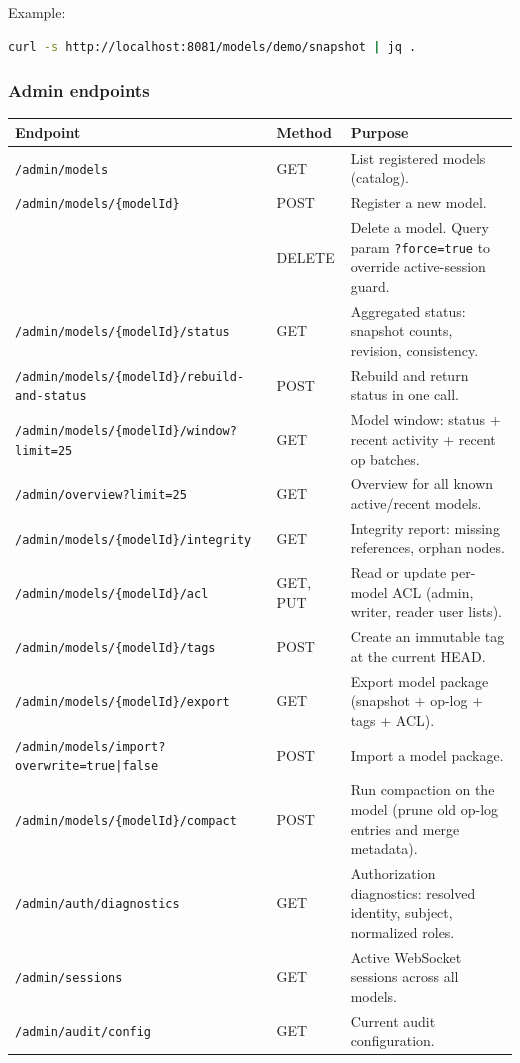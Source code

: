 Example:

\begin{lstlisting}[language=bash,caption={Get snapshot}]
curl -s http://localhost:8081/models/demo/snapshot | jq .
\end{lstlisting}

\subsubsection{Admin endpoints}

\begin{longtable}{p{54mm}p{44mm}p{56mm}}
\toprule
Endpoint & Method & Purpose \\
\midrule
\texttt{/admin/models} & GET & List registered models (catalog). \\
\texttt{/admin/models/\{modelId\}} & POST & Register a new model. \\
& DELETE & Delete a model. Query param
  \texttt{?force=true} to override active-session guard. \\
\texttt{/admin/models/\{modelId\}/status} & GET & Aggregated status:
  snapshot counts, revision, consistency. \\
\texttt{/admin/models/\{modelId\}/rebuild-and-status} & POST & Rebuild and
  return status in one call. \\
\texttt{/admin/models/\{modelId\}/window?limit=25} & GET & Model window:
  status + recent activity + recent op batches. \\
\texttt{/admin/overview?limit=25} & GET & Overview for all known
  active/recent models. \\
\texttt{/admin/models/\{modelId\}/integrity} & GET & Integrity report:
  missing references, orphan nodes. \\
\texttt{/admin/models/\{modelId\}/acl} & GET, PUT & Read or update
  per-model ACL (admin, writer, reader user lists). \\
\texttt{/admin/models/\{modelId\}/tags} & POST & Create an immutable tag
  at the current HEAD. \\
\texttt{/admin/models/\{modelId\}/export} & GET & Export model package
  (snapshot + op-log + tags + ACL). \\
\texttt{/admin/models/import?overwrite=true|false} & POST & Import a model
  package. \\
\texttt{/admin/models/\{modelId\}/compact} & POST & Run compaction on
  the model (prune old op-log entries and merge metadata). \\
\texttt{/admin/auth/diagnostics} & GET & Authorization diagnostics:
  resolved identity, subject, normalized roles. \\
\texttt{/admin/sessions} & GET & Active WebSocket sessions across all
  models. \\
\texttt{/admin/audit/config} & GET & Current audit configuration. \\
\bottomrule
\end{longtable}

